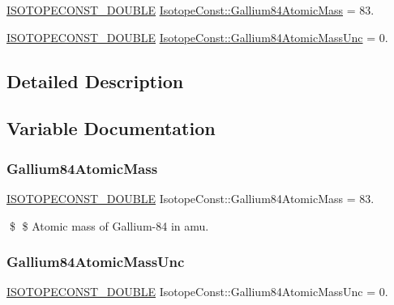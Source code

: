 \begin{DoxyCompactItemize}
\item 
\mbox{\hyperlink{group___isotope_const-_macros_ga8f45a7272ce02c0b4c65c44636ed719a}{I\+S\+O\+T\+O\+P\+E\+C\+O\+N\+S\+T\+\_\+\+D\+O\+U\+B\+LE}} \mbox{\hyperlink{group___isotope_const-_gallium-_ga84_ga3966dbfa7ad8016ce387a940686f0b7f}{Isotope\+Const\+::\+Gallium84\+Atomic\+Mass}} = 83.
\item 
\mbox{\hyperlink{group___isotope_const-_macros_ga8f45a7272ce02c0b4c65c44636ed719a}{I\+S\+O\+T\+O\+P\+E\+C\+O\+N\+S\+T\+\_\+\+D\+O\+U\+B\+LE}} \mbox{\hyperlink{group___isotope_const-_gallium-_ga84_ga3492cb0c2890e30f4782a69275d8e69d}{Isotope\+Const\+::\+Gallium84\+Atomic\+Mass\+Unc}} = 0.
\end{DoxyCompactItemize}


\subsection{Detailed Description}


\subsection{Variable Documentation}
\mbox{\label{group___isotope_const-_gallium-_ga84_ga3966dbfa7ad8016ce387a940686f0b7f}} 
\subsubsection{\texorpdfstring{Gallium84\+Atomic\+Mass}{Gallium84AtomicMass}}
{\footnotesize\ttfamily \mbox{\hyperlink{group___isotope_const-_macros_ga8f45a7272ce02c0b4c65c44636ed719a}{I\+S\+O\+T\+O\+P\+E\+C\+O\+N\+S\+T\+\_\+\+D\+O\+U\+B\+LE}} Isotope\+Const\+::\+Gallium84\+Atomic\+Mass = 83.}

\$ \$ Atomic mass of Gallium-\/84 in amu. \mbox{\label{group___isotope_const-_gallium-_ga84_ga3492cb0c2890e30f4782a69275d8e69d}} 
\subsubsection{\texorpdfstring{Gallium84\+Atomic\+Mass\+Unc}{Gallium84AtomicMassUnc}}
{\footnotesize\ttfamily \mbox{\hyperlink{group___isotope_const-_macros_ga8f45a7272ce02c0b4c65c44636ed719a}{I\+S\+O\+T\+O\+P\+E\+C\+O\+N\+S\+T\+\_\+\+D\+O\+U\+B\+LE}} Isotope\+Const\+::\+Gallium84\+Atomic\+Mass\+Unc = 0.}


